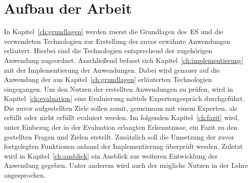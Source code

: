 \section{Aufbau der Arbeit}\label{sec:aufbau-der-arbeit}
In Kapitel~\ref{ch:grundlagen} werden zuerst die Grundlagen des~\ac{ES} und die verwendeten Technologien
zur Erstellung der zuvor erwähnte Anwendungen erläutert.
Hierbei sind die Technologien entsprechend der zugehörigen Anwendung zugeordnet.
Anschließend befasst sich Kapitel~\ref{ch:implementierung} mit der Implementierung der Anwendungen.
Dabei wird genauer auf die Anwendung der aus Kapitel~\ref{ch:grundlagen} erläuterten Technologien eingegangen.
Um den Nutzen der erstellten Anwendungen zu prüfen, wird in Kapitel~\ref{ch:evaluation} eine Evaluierung mittels Expertengespräch durchgeführt.
Die zuvor aufgestellten Ziele sollen somit, gemeinsam mit einem Experten, als erfüllt oder nicht erfüllt evaluiert werden.
Im folgenden Kapitel~\ref{ch:fazit} wird, unter Einbezug der in der Evaluation erlangten Erkenntnisse, ein Fazit zu den gestellten Fragen und Zielen erstellt.
Zusätzlich soll die Umsetzung der zuvor festgelegten Funktionen anhand der Implementierung überprüft werden.
Zuletzt wird in Kapitel~\ref{ch:ausblick} ein Ausblick zur weiteren Entwicklung der Anwendung gegeben.
Unter anderem wird auch der mögliche Nutzen in der Lehre angesprochen.
